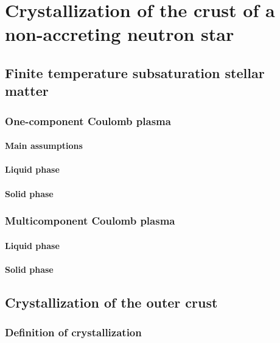 \chapter{Crystallization of the crust of a non-accreting neutron star}

\section{Finite temperature subsaturation stellar matter}

\subsection{One-component Coulomb plasma}

\subsubsection{Main assumptions}

\subsubsection{Liquid phase}

\subsubsection{Solid phase}

\subsection{Multicomponent Coulomb plasma}

\subsubsection{Liquid phase}

\subsubsection{Solid phase}

\section{Crystallization of the outer crust}

\subsection{Definition of crystallization}

